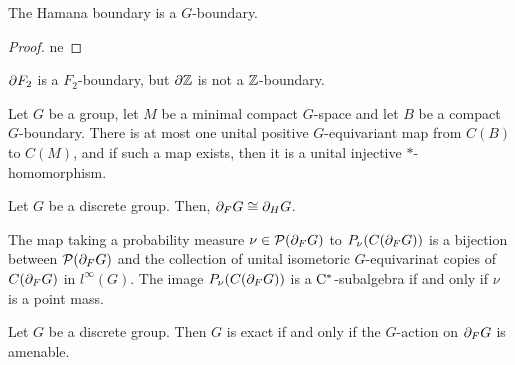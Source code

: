 \begin{remark}
  The Hamana boundary is a $G$-boundary. 
\end{remark}

\begin{proof}
  ne
\end{proof}

\begin{remark}
  $\frak{\partial} F_2$ is a $F_2$-boundary, but $\frak{\partial} \mathbb{Z}$ is not a $\mathbb{Z}$-boundary.
\end{remark}

\begin{lemma}
  Let $G$ be a group,
  let $M$ be a minimal compact $G$-space and let $B$ be a compact $G$-boundary.
  There is at most one unital positive $G$-equivariant map from $C(B)$ to $C(M)$,
  and if such a map exists, then it is a unital injective $*$-homomorphism.
\end{lemma}

\begin{theorem}
  Let $G$ be a discrete group.
  Then, $\frak{\partial}_F G \cong \frak{\partial}_H G$.
\end{theorem}

\begin{proposition}
  The map taking a probability measure $\nu \in \mathcal{P}(\frak{\partial}_F G)$ to $P_\nu(C(\frak{\partial}_F G))$ is a bijection between $\mathcal{P}(\frak{\partial}_F G)$ and the collection of unital isometoric $G$-equivarinat copies of $C(\frak{\partial}_F G)$ in $l^\infty(G)$.
  The image $P_\nu(C(\frak{\partial}_F G))$ is a $\rm{C}^*$-subalgebra if and only if $\nu$ is a point mass.
\end{proposition}

\begin{theorem}
  Let $G$ be a discrete group.
  Then $G$ is exact if and only if the $G$-action on $\frak{\partial}_F G$ is amenable.
\end{theorem}

